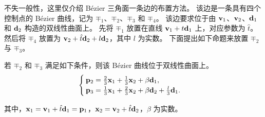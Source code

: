 不失一般性，这里仅介绍 B\'{e}zier 三角面一条边的布置方法。
该边是一条具有四个控制点的 B\'{e}zier 曲线，记为 $\mp_1$、$\mp_2$、$\mp_3$ 和 $\mp_4$。
该边要求位于由 $\mathbf{v}_1$、$\mathbf{v}_2$、$\mathbf{d}_1$ 和 $\mathbf{d}_2$ 构造的双线性曲面上。
%
先将 $\mp_1$ 放置在直线 $\mathbf{v}_1 + t \mathbf{d}_1$ 上，对应参数为 $\hat{t}$。
然后将 $\mp_4$ 放置为 $\mathbf{v}_2 + \hat{t} \mathbf{d}_2 + l \mathbf{d}_2$，其中 $l$ 为实数。
%
下面提出如下命题来放置 $\mp_2$ 与 $\mp_3$。
\begin{proposition}\label{prop:bezier-curve}
    若 $\mp_2$ 和 $\mp_3$ 满足如下条件，则该 B\'{e}zier 曲线位于双线性曲面上。
\begin{equation}\label{equ:edge-control-1}
	\begin{cases}
		\mathbf{p}_2= \frac{2}{3}\mathbf{x}_1 + \frac{1}{3}\mathbf{x}_2 + \beta \mathbf{d}_1, &\\
		\mathbf{p}_3 = \frac{1}{3}\mathbf{x}_1 + \frac{2}{3}\mathbf{x}_2 + \beta \mathbf{d}_2+\frac{l}{3}\mathbf{d}_1.&
	\end{cases}
\end{equation}

其中，$\mathbf{x}_1 = \mathbf{v}_1 + \hat{t} \mathbf{d}_1 = \mathbf{p}_1$，$\mathbf{x}_2 = \mathbf{v}_2 + \hat{t} \mathbf{d}_2$，$\beta$ 为实数。 %
\end{proposition}
